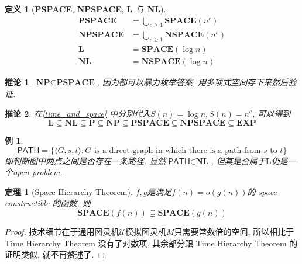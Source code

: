 \documentclass[8pt]{article}
\theoremstyle{compact}
\newtheorem{theorem}{定理}[section]
\newtheorem{definition}{定义}[section]
\newtheorem{corollary}{推论}[section]
\newtheorem{example}{例}[section]
\def\ge{\geqslant}
\def\P{\textbf{P}}
\def\NP{\textbf{NP}}
\def\EXP{\textbf{EXP}}
\def\SPACE{\textbf{SPACE}}
\def\NSPACE{\textbf{NSPACE}}
\def\PSPACE{\textbf{PSPACE}}
\def\NPSPACE{\textbf{NPSPACE}}
\def\L{\textbf{L}}
\def\NL{\textbf{NL}}
\begin{document}
\begin{definition}[\PSPACE, \NPSPACE, \L \ 与 \NL]
	\begin{align*}
		\PSPACE &= \bigcup_{c \ge 1}\SPACE(n^c)\\
		\NPSPACE &= \bigcup_{c \ge 1}\NSPACE(n^c)\\
		\L &= \SPACE(\log n)\\
		\NL &= \NSPACE(\log n)
	\end{align*}
\end{definition}
\begin{corollary}
	$\NP \subseteq \PSPACE$, 因为都可以暴力枚举答案, 用多项式空间存下来然后验证. 
\end{corollary}
\begin{corollary}
	在\cref{time_and_space} 中分别代入$S(n) = \log n, S(n) = n^c$, 可以得到
	$$\L \subseteq \NL \subseteq \P \subseteq \NP \subseteq \PSPACE \subseteq \NPSPACE \subseteq \EXP$$
\end{corollary}
\begin{example}
	$$\textsf{PATH} = \{ \langle G, s, t\rangle : G \textrm{ is a direct graph in which there is a path from }s \textrm{ to } t\}$$
	即判断图中两点之间是否存在一条路径. 显然$\textsf{PATH} \in \NL$, 但其是否属于$\L$仍是一个open problem. 
\end{example}
\begin{theorem}[Space Hierarchy Theorem]
	$f, g$是满足$f(n) = o(g(n))$的 space constructible 的函数, 则
	$$\SPACE(f(n)) \subsetneq \SPACE(g(n))$$
\end{theorem}
\begin{proof}
	技术细节在于通用图灵机$\mathcal U$模拟图灵机$M$只需要常数倍的空间, 所以相比于 Time Hierarchy Theorem 没有了对数项. 其余部分跟 Time Hierarchy Theorem 的证明类似, 就不再赘述了. 	
\end{proof}
\end{document}
